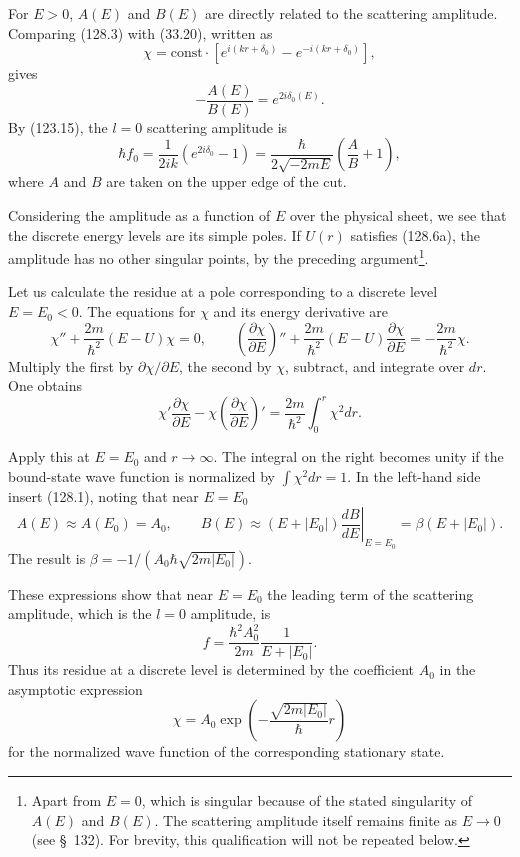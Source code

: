 For $E>0$, $A(E)$ and $B(E)$ are directly related to the scattering amplitude.
Comparing (128.3) with (33.20), written as
\begin{equation}
 \chi=\mathrm{const}\cdot[e^{i(kr+\delta_0)}-e^{-i(kr+\delta_0)}],
 \tag{128.7}
\end{equation}
gives
\begin{equation}
 -\frac{A(E)}{B(E)}=e^{2i\delta_0(E)}.
 \tag{128.8}
\end{equation}
By (123.15), the $l=0$ scattering amplitude is
\begin{equation}
 \hbar f_0=\frac1{2ik}(e^{2i\delta_0}-1)
 =\frac{\hbar}{2\sqrt{-2mE}}\left(\frac AB+1\right),
 \tag{128.9}
\end{equation}
where $A$ and $B$ are taken on the upper edge of the cut.

Considering the amplitude as a function of $E$ over the physical sheet, we
see that the discrete energy levels are its simple poles. If $U(r)$ satisfies
(128.6a), the amplitude has no other singular points, by the preceding
argument\footnote{Apart from $E=0$, which is singular because of the stated
singularity of $A(E)$ and $B(E)$. The scattering amplitude itself remains
finite as $E\to0$ (see \S~132). For brevity, this qualification will not be
repeated below.}.

Let us calculate the residue at a pole corresponding to a discrete level
$E=E_0<0$. The equations for $\chi$ and its energy derivative are
\[
 \chi''+\frac{2m}{\hbar^2}(E-U)\chi=0,\qquad
 \left(\frac{\partial\chi}{\partial E}\right)''
 +\frac{2m}{\hbar^2}(E-U)\frac{\partial\chi}{\partial E}
 =-\frac{2m}{\hbar^2}\chi.
\]
Multiply the first by $\partial\chi/\partial E$, the second by $\chi$,
subtract, and integrate over $dr$. One obtains
\begin{equation}
 \chi'\frac{\partial\chi}{\partial E}
 -\chi\left(\frac{\partial\chi}{\partial E}\right)'
 =\frac{2m}{\hbar^2}\int_0^r\chi^2dr.
 \tag{128.10}
\end{equation}

Apply this at $E=E_0$ and $r\to\infty$. The integral on the right becomes
unity if the bound-state wave function is normalized by
$\int\chi^2dr=1$. In the left-hand side insert (128.1), noting that near
$E=E_0$
\[
 A(E)\approx A(E_0)=A_0,\qquad
 B(E)\approx(E+|E_0|)\left.\frac{dB}{dE}\right|_{E=E_0}
 =\beta(E+|E_0|).
\]
The result is $\beta=-1/(A_0\hbar\sqrt{2m|E_0|})$.

These expressions show that near $E=E_0$ the leading term of the scattering
amplitude, which is the $l=0$ amplitude, is
\begin{equation}
 f=\frac{\hbar^2A_0^2}{2m}\frac1{E+|E_0|}.
 \tag{128.11}
\end{equation}
Thus its residue at a discrete level is determined by the coefficient $A_0$
in the asymptotic expression
\begin{equation}
 \chi=A_0\exp\left(-\frac{\sqrt{2m|E_0|}}{\hbar}r\right)
 \tag{128.12}
\end{equation}
for the normalized wave function of the corresponding stationary state.

